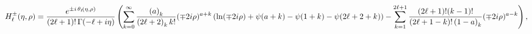 \[\mathop{{H^{\pm}_{\ell}}\/}\nolimits\!\left(\eta,\rho\right)=\frac{e^{\pm i%
\mathop{{\theta_{\ell}}\/}\nolimits\!\left(\eta,\rho\right)}}{(2\ell+1)!%
\mathop{\Gamma\/}\nolimits\!\left(-\ell+i\eta\right)}\left(\sum_{k=0}^{\infty}%
\frac{\left(a\right)_{k}}{\left(2\ell+2\right)_{k}k!}(\mp 2i\rho)^{a+k}\left(%
\mathop{\ln\/}\nolimits\!\left(\mp 2i\rho\right)+\mathop{\psi\/}\nolimits\!%
\left(a+k\right)-\mathop{\psi\/}\nolimits\!\left(1+k\right)-\mathop{\psi\/}%
\nolimits\!\left(2\ell+2+k\right)\right)-\sum_{k=1}^{2\ell+1}\frac{(2\ell+1)!(%
k-1)!}{(2\ell+1-k)!\left(1-a\right)_{k}}(\mp 2i\rho)^{a-k}\right),\]